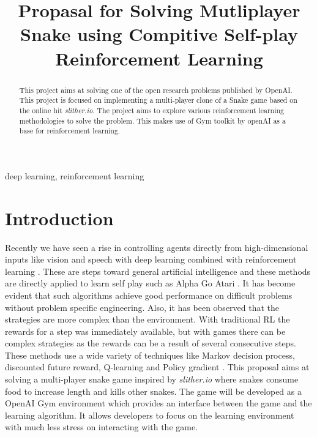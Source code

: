 \documentclass[conference]{IEEEtran}
\begin{document}
\title{Propasal for Solving Mutliplayer Snake using Compitive Self-play Reinforcement Learning}

\author{
\and
{}
\and
{}
}

\maketitle

\begin{abstract}
This project aims at solving one of the open research problems published by OpenAI\cite{n3}. This project is focused on implementing a multi-player clone of a Snake game based on the online hit \textit{slither.io}. The project aims to explore various reinforcement learning methodologies to solve the problem. This makes use of Gym toolkit by openAI as a base for reinforcement learning.
\end{abstract}

\begin{IEEEkeywords}
deep learning, reinforcement learning
\end{IEEEkeywords}

\section{Introduction}
Recently we have seen a rise in controlling agents directly from
high-dimensional inputs like vision and speech with deep learning combined
with reinforcement learning \cite{sp3} \cite{sd5}. These are steps toward
general artificial intelligence and these methods are directly applied to
learn self play such as Alpha Go \cite{sp9} Atari \cite{sp3}. It has become
evident that such algorithms achieve good performance on difficult problems
without problem specific engineering. Also, it has been observed that the
strategies are more complex than the environment. With traditional RL the
rewards for a step was immediately available, but with games there can be
complex strategies as the rewards can be a result of several consecutive steps.
These methods use a wide variety of techniques like Markov decision process,
discounted future reward, Q-learning \cite{sd5} and
Policy gradient \cite{sp10}.\break
This proposal aims at solving a multi-player snake game inspired by
\textit{slither.io} \cite{sd2} where snakes consume food to increase length and
kills other snakes. The game will be developed as a
OpenAI Gym \cite{sd2} environment which provides an interface between the game
and the learning algorithm. It allows developers to focus on the learning
environment with much less stress on interacting with the game.
\end{document}

